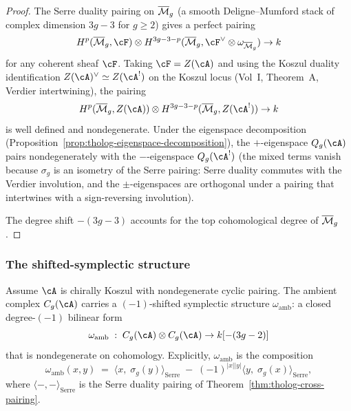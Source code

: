 \begin{proof}
The Serre duality pairing on $\overline{\mathcal{M}}_g$ (a smooth
Deligne--Mumford stack of complex dimension $3g - 3$ for
$g \geq 2$) gives a perfect pairing
\[
H^p(\Mbar_g, \cF) \otimes H^{3g-3-p}(\Mbar_g, \cF^\vee
\otimes \omega_{\Mbar_g}) \to k
\]
for any coherent sheaf $\cF$.
Taking $\cF = Z(\cA)$ and using the Koszul duality
identification $Z(\cA)^\vee \simeq Z(\cA^!)$ on the Koszul
locus (Vol~I, Theorem~A, Verdier intertwining), the pairing
\[
H^p(\Mbar_g, Z(\cA)) \otimes H^{3g-3-p}(\Mbar_g, Z(\cA^!)) \to k
\]
is well defined and nondegenerate.
Under the eigenspace decomposition
(Proposition~\ref{prop:tholog-eigenspace-decomposition}),
the $+$-eigenspace $Q_g(\cA)$ pairs nondegenerately with the
$-$-eigenspace $Q_g(\cA^!)$ (the mixed terms vanish because
$\sigma_g$ is an isometry of the Serre pairing: Serre duality
commutes with the Verdier involution, and the $\pm$-eigenspaces
are orthogonal under a pairing that intertwines with a
sign-reversing involution).

The degree shift $-(3g-3)$ accounts for the top cohomological
degree of $\overline{\mathcal{M}}_g$.
\end{proof}

\subsubsection{The shifted-symplectic structure}

\begin{theorem}
\label{thm:tholog-shifted-symplectic}
Assume $\cA$ is chirally Koszul with nondegenerate cyclic
pairing.
The ambient complex $C_g(\cA)$ carries a
$(-1)$-shifted symplectic structure $\omega_{\mathrm{amb}}$:
a closed degree-$(-1)$ bilinear form
\[
\omega_{\mathrm{amb}}
\;:\;
C_g(\cA) \otimes C_g(\cA) \to k[-(3g-2)]
\]
that is nondegenerate on cohomology.
Explicitly, $\omega_{\mathrm{amb}}$ is the composition
\begin{equation}%
\omega_{\mathrm{amb}}(x, y)
\;=\;
\langle x,\; \sigma_g(y) \rangle_{\mathrm{Serre}}
\;-\;
(-1)^{|x||y|}\langle y,\; \sigma_g(x) \rangle_{\mathrm{Serre}},
\end{equation}
where $\langle -, - \rangle_{\mathrm{Serre}}$ is the Serre
duality pairing of Theorem~\ref{thm:tholog-cross-pairing}.
\end{theorem}

